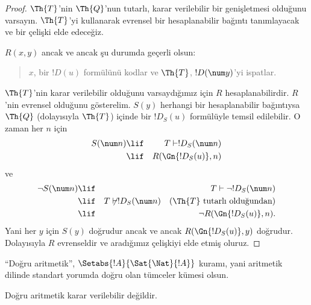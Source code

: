 \begin{proof}
$\Th{T}$'nin $\Th{Q}$'nun tutarlı, karar verilebilir bir genişletmesi
olduğunu varsayın. $\Th{T}$'yi kullanarak evrensel bir hesaplanabilir
bağıntı tanımlayacak ve bir çelişki elde edeceğiz.

$R(x,y)$ ancak ve ancak şu durumda geçerli olsun:
\begin{quote}
$x$, bir $!D(u)$ formülünü kodlar ve $\Th{T}$, $!D(\num y)$'yi ispatlar.
\end{quote}
$\Th{T}$'nin karar verilebilir olduğunu varsaydığımız için $R$
hesaplanabilirdir. $R$'nin evrensel olduğunu gösterelim. $S(y)$ herhangi bir
hesaplanabilir bağıntıysa $\Th{Q}$ (dolayısıyla $\Th{T}$) içinde bir
$!D_S(u)$ formülüyle temsil edilebilir. O zaman her $n$ için
\begin{eqnarray*}
S(\num n) & \lif & T \vdash !D_S(\num n) \\
& \lif & R(\Gn{!D_S(u)}, n)
\end{eqnarray*}
ve
\begin{eqnarray*}
\lnot S(\num n) & \lif & T \vdash \lnot !D_S(\num n) \\
& \lif & T \not\vdash !D_S(\num n) \quad \text{($\Th{T}$ tutarlı
  olduğundan)} \\
& \lif & \lnot R(\Gn{!D_S(u)}, n).
\end{eqnarray*}
Yani her $y$ için $S(y)$ doğrudur ancak ve ancak
$R(\Gn{!D_S(u)}, y)$ doğrudur. Dolayısıyla $R$ evrenseldir ve aradığımız
çelişkiyi elde etmiş oluruz.
\end{proof}

“Doğru aritmetik”, $\Setabs{!A}{ \Sat{\Nat}{!A}}$ kuramı, yani aritmetik
dilinde standart yorumda doğru olan tümceler kümesi olsun.

\begin{cor}
Doğru aritmetik karar verilebilir değildir.
\end{cor}


